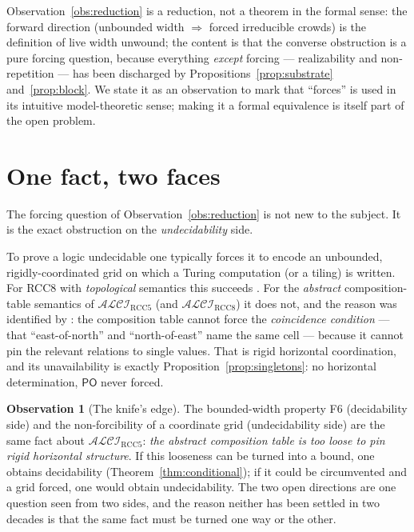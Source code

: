 \documentclass[11pt]{article}
\newcommand{\ALCIRCC}{\mathcal{ALCI}_{\mathrm{RCC5}}}
\newcommand{\PO}{\mathsf{PO}}
\theoremstyle{plain}
\theoremstyle{definition}
\newtheorem{observation}[theorem]{Observation}
\begin{document}
Observation~\ref{obs:reduction} is a reduction, not a theorem in the
formal sense: the forward direction (unbounded width $\Rightarrow$
forced irreducible crowds) is the definition of live width unwound; the
content is that the converse obstruction is a pure forcing question,
because everything \emph{except} forcing --- realizability and
non-repetition --- has been discharged by
Propositions~\ref{prop:substrate} and~\ref{prop:block}. We state it as
an observation to mark that ``forces'' is used in its intuitive
model-theoretic sense; making it a formal equivalence is itself part of
the open problem.

\section{One fact, two faces}\label{sec:knife}

The forcing question of Observation~\ref{obs:reduction} is not new to
the subject. It is the exact obstruction on the \emph{undecidability}
side.

To prove a logic undecidable one typically forces it to encode an
unbounded, rigidly-coordinated grid on which a Turing computation (or a
tiling) is written. For RCC8 with \emph{topological} semantics this
succeeds \cite{lutzwolter2006}. For the \emph{abstract}
composition-table semantics of $\ALCIRCC$ (and $\mathcal{ALCI}_{\mathrm
{RCC8}}$) it does not, and the reason was identified by
\cite{wessel2003}: the composition table cannot force the
\emph{coincidence condition} --- that ``east-of-north'' and
``north-of-east'' name the same cell --- because it cannot pin the
relevant relations to single values. That is rigid horizontal
coordination, and its unavailability is exactly
Proposition~\ref{prop:singletons}: no horizontal determination, $\PO$
never forced.

\begin{observation}[The knife's edge]\label{obs:knife}
The bounded-width property F6 (decidability side) and the
non-forcibility of a coordinate grid (undecidability side) are the same
fact about $\ALCIRCC$: \emph{the abstract composition table is too
loose to pin rigid horizontal structure}. If this looseness can be
turned into a bound, one obtains decidability
(Theorem~\ref{thm:conditional}); if it could be circumvented and a grid
forced, one would obtain undecidability. The two open directions are one
question seen from two sides, and the reason neither has been settled in
two decades is that the same fact must be turned one way or the other.
\end{observation}
\end{document}
